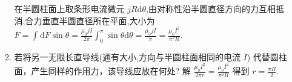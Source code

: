 \begin{itemize}
\begin{enumerate}
                    在半圆柱面上取条形电流微元 $jR\mathrm{d}\theta$,由对称性沿半圆直径方向的力互相抵消,合力垂直半圆直径所在平面,大小为 $F=\int_{}^{}\mathrm{d}F\sin\theta=\frac{\mu_0jI}{2\pi}\int_{0}^{\pi}\sin\theta\mathrm{d}\theta=\frac{\mu_0jI}{\pi}=\frac{\mu_0I^2}{\pi^2R}$.
                \item 若将另一无限长直导线(通有大小,方向与半圆柱面相同的电流 $I$) 代替圆柱面，产生同样的作用力，该导线应放在何处?
                    解 $\frac{\mu_0I^2}{2\pi r}=\frac{\mu_0I^2}{\pi^2R}$ 得到 $r=\frac{\pi R}{2}$.
            \end{enumerate}
    \end{itemize}

